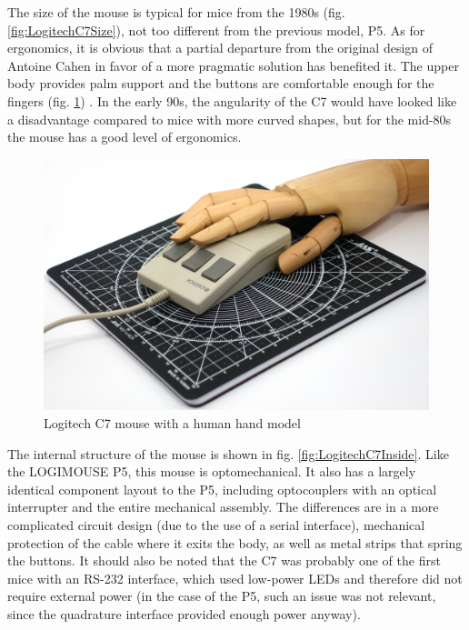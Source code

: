 \documentclass[11pt, a4paper]{article}
\begin{document}
The size of the mouse is typical for mice from the 1980s (fig. \ref{fig:LogitechC7Size}), not too different from the previous model, P5. As for ergonomics, it is obvious that a partial departure from the original design of Antoine Cahen in favor of a more pragmatic solution has benefited it. The upper body provides palm support and the buttons are comfortable enough for the fingers (fig. \ref{fig:LogitechC7Hand}) \cite{manual1, manual2}. In the early 90s, the angularity of the C7 would have looked like a disadvantage compared to mice with more curved shapes, but for the mid-80s the mouse has a good level of ergonomics.

\begin{figure}[h]
    \centering
    \includegraphics[scale=0.35]{1985_logitech_c7_mouse/hand_30.jpg}
    \caption{Logitech C7 mouse with a human hand model}
    \label{fig:LogitechC7Hand}
\end{figure}

The internal structure of the mouse is shown in fig. \ref{fig:LogitechC7Inside}. Like the LOGIMOUSE P5, this mouse is optomechanical. It also has a largely identical component layout to the P5, including optocouplers with an optical interrupter and the entire mechanical assembly. The differences are in a more complicated circuit design (due to the use of a serial interface), mechanical protection of the cable where it exits the body, as well as metal strips that spring the buttons. It should also be noted that the C7 was probably one of the first mice with an RS-232 interface, which used low-power LEDs and therefore did not require external power (in the case of the P5, such an issue was not relevant, since the quadrature interface provided enough power anyway).
\end{document}
